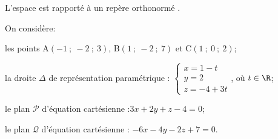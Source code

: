 
\medskip

%

L'espace est rapporté à un repère orthonormé \Oijk.

\medskip

\begin{list}{\textbullet}{On considère:}
\item les points A$(-1~;~-2~;~3)$, B$(1~;~-2~;~7)$ et C$(1~;~0~;~2)$;
\item la droite $\Delta$ de représentation paramétrique : \quad $\left\{\begin{array}{l}x=1-t \\ y=2 \\ z=-4+3 t\end{array}\right.$, où $t \in \R$;
\item le plan $\mathcal{P}$ d'équation cartésienne :\quad $3 x+2 y+z-4=0$;
\item le plan $\mathcal{Q}$ d'équation cartésienne : \quad $-6 x-4 y-2 z+7=0$.
\end{list}

